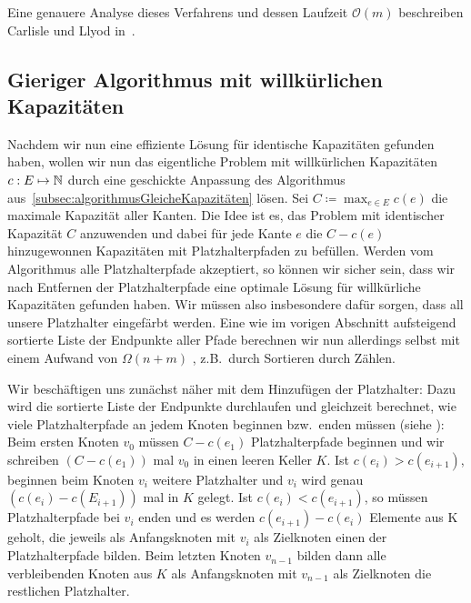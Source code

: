 Eine genauere Analyse dieses Verfahrens und dessen Laufzeit $\mathcal O(m)$ beschreiben Carlisle und Llyod in~\cite{carlisle}.

\subsection{Gieriger Algorithmus mit willkürlichen Kapazitäten}\label{subsec:anpassenAnWillkürlicheKapazitäten}

Nachdem wir nun eine effiziente Lösung für identische Kapazitäten gefunden haben, wollen wir nun das eigentliche Problem mit
willkürlichen Kapazitäten $c: E \mapsto \mathbb N$ durch eine geschickte Anpassung des Algorithmus aus~\ref{subsec:algorithmusGleicheKapazitäten} lösen.
Sei $C \coloneqq \max_{e \in E} c(e)$ die maximale Kapazität aller Kanten.
Die Idee ist es, das Problem mit identischer Kapazität $C$ anzuwenden und dabei für jede Kante $e$ die $C - c(e)$
hinzugewonnen Kapazitäten mit Platzhalterpfaden zu befüllen.
Werden vom Algorithmus alle Platzhalterpfade akzeptiert, so können wir sicher sein, dass wir nach Entfernen der
Platzhalterpfade eine optimale Lösung für willkürliche Kapazitäten gefunden haben.
Wir müssen also insbesondere dafür sorgen, dass all unsere Platzhalter eingefärbt werden.
Eine wie im vorigen Abschnitt aufsteigend sortierte Liste der Endpunkte aller Pfade berechnen wir nun allerdings selbst mit einem Aufwand von $\Omega(n+m)$
, z.B.\ durch Sortieren durch Zählen.

Wir beschäftigen uns zunächst näher mit dem Hinzufügen der Platzhalter:
Dazu wird die sortierte Liste der Endpunkte durchlaufen und gleichzeit berechnet, wie viele Platzhalterpfade an jedem Knoten
beginnen bzw.\ enden müssen (siehe ):
Beim ersten Knoten $v_0$ müssen $C - c(e_1)$ Platzhalterpfade beginnen und wir schreiben $(C - c(e_1))$ mal $v_0$ in einen
leeren Keller $K$.
Ist $c(e_i) > c(e_{i+1})$, beginnen beim Knoten $v_{i}$ weitere Platzhalter und $v_i$ wird genau $(c(e_i) - c(E_{i+1}))$ mal in $K$ gelegt.
Ist $c(e_i) < c(e_{i+1})$, so müssen Platzhalterpfade bei $v_i$ enden und es werden $c(e_{i+1}) - c(e_i)$ Elemente aus K geholt, die jeweils als Anfangsknoten mit $v_i$
als Zielknoten einen der Platzhalterpfade bilden.
Beim letzten Knoten $v_{n-1}$ bilden dann alle verbleibenden Knoten aus $K$ als Anfangsknoten mit $v_{n-1}$ als Zielknoten die restlichen Platzhalter.

